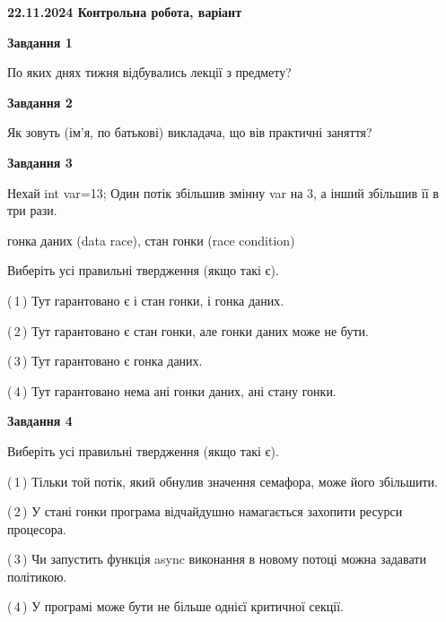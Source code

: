 \documentclass[12pt, ukrainian]{article}
\begin{document}
\begin {large}

\textbf{22.11.2024 Контрольна робота, варіант  }\par


{

\begin{center}
\textbf{Завдання 1}
\end{center}

По яких днях тижня відбувались лекції з предмету?


\begin{center}
\textbf{Завдання 2}
\end{center}

Як зовуть (ім'я, по батькові) викладача, що вів практичні заняття?


\begin{center}
\textbf{Завдання 3}
\end{center}

Нехай int var=13; Один потік збільшив змінну var на 3, а інший збільшив її в три рази.

гонка даних (data race), стан гонки (race condition)

Виберіть усі правильні твердження (якщо такі є).\par
\vspace{2mm}
(\,1\,) Тут гарантовано є і стан гонки, і гонка даних.%

(\,2\,) Тут гарантовано є стан гонки, але гонки даних може не бути.%

(\,3\,) Тут гарантовано є гонка даних.%

(\,4\,) Тут гарантовано нема ані гонки даних, ані стану гонки.%


\begin{center}
\textbf{Завдання 4}
\end{center}

Виберіть усі правильні твердження (якщо такі є).\par
\vspace{2mm}

(\,1\,) Тільки той потік, який обнулив значення семафора, може його збільшити.%

(\,2\,) У стані гонки програма відчайдушно намагається захопити ресурси процесора.%

(\,3\,) Чи запустить функція  async виконання в новому потоці можна задавати політикою.%

(\,4\,) У програмі може бути не більше однієї критичної секції.%


}
\end{large}
\end{document}
